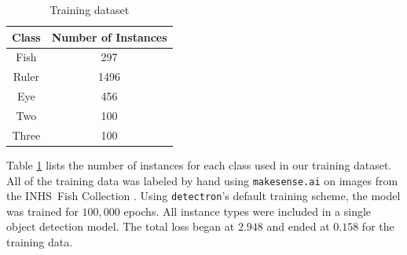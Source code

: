 \documentclass[conference]{IEEEtran}
\begin{document}

\begin{table}[H]
    \centering
      \caption{Training dataset}
    \label{tab:dataset}
    \begin{tabular}{cc}
        \toprule
        \textbf{Class} & \textbf{Number of Instances}\\
        \midrule
        Fish & 297\\
        Ruler & 1496\\
        Eye & 456\\
        Two & 100\\
        Three & 100\\
      \bottomrule
    \end{tabular}
\end{table}

Table \ref{tab:dataset} lists the number of instances for each class 
used in our training dataset.
All of the training data was labeled by hand using \verb|makesense.ai| \cite{make-sense}
on images from the INHS\ Fish Collection \cite{INHS}.
Using \verb|detectron|'s default training scheme, the model was trained for \(100,000\) epochs. All instance types were included in a single object detection model. The total loss began at \(2.948\) and ended at \(0.158\) for the training data.
\end{document}
